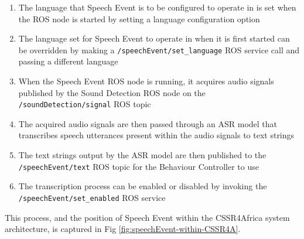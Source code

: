 \documentclass{CSSRforAfrica}
\begin{document}
\begin{enumerate}
    \item The language that Speech Event is to be configured to operate in is set when the ROS node is started by setting a language configuration option
    \item The language set for Speech Event to operate in when it is first started can be overridden by making a \texttt{/speechEvent/set\_language} ROS service call and passing a different language
    \item When the Speech Event ROS node is running, it acquires audio signals published by the Sound Detection ROS node on the \texttt{/soundDetection/signal} ROS topic
    \item The acquired audio signals are then passed through an ASR model that transcribes speech utterances present within the audio signals to text strings
    \item The text strings output by the ASR model are then published to the \texttt{/speechEvent/text} ROS topic for the Behaviour Controller to use
    \item The transcription process can be enabled or disabled by invoking the \texttt{/speechEvent/set\_enabled} ROS service
\end{enumerate}

This process, and the position of Speech Event within the CSSR4Africa system architecture, is captured in Fig \ref{fig:speechEvent-within-CSSR4A}.
\end{document}
